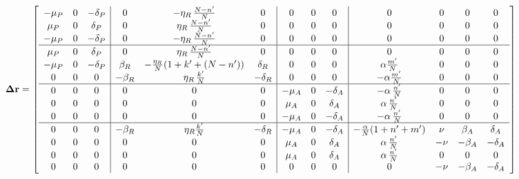 \begin{center}
\begin{sideways}
\begin{minipage}{\textheight}
\begin{equation}
{\bf \Delta r} = 
\left[ \begin{array}{ccc|ccc|ccc|cccc}
-\mu_P & 0 & -\delta_P   & 0 & -\eta_R\,\frac{N-n'}{N} & 0  & 0 & 0 & 0  & 0 & 0 & 0 & 0 \\
 \mu_P & 0 &  \delta_P   & 0 &  \eta_R\,\frac{N-n'}{N} & 0  & 0 & 0 & 0  & 0 & 0 & 0 & 0 \\
-\mu_P & 0 & -\delta_P   & 0 & -\eta_R\,\frac{N-n'}{N} & 0  & 0 & 0 & 0  & 0 & 0 & 0 & 0 \\
\hline
 \mu_P & 0  &  \delta_P   & 0        & \eta_R\,\frac{N-n'}{N}          & 0          & 0 & 0 & 0  & 0                   & 0 & 0 & 0  \\
-\mu_P & 0  & -\delta_P   &  \beta_R & -\frac{\eta_R}{N}(1+k'+(N-n'))  &  \delta_R  & 0 & 0 & 0  & \alpha\frac{m'}{N}  & 0 & 0 & 0 \\
 0     & 0  &  0          & -\beta_R & \eta_R\,\frac{k'}{N}            & -\delta_R  & 0 & 0 & 0  & -\alpha\frac{m'}{N} & 0 & 0 & 0 \\
\hline
0 & 0 & 0                 & 0 & 0 & 0                                              & -\mu_A & 0 & -\delta_A     & -\alpha\,\frac{n'}{N}       &  0   &  0       &  0 \\
0 & 0 & 0                 & 0 & 0 & 0                                              &  \mu_A & 0 &  \delta_A     &  \alpha\,\frac{n'}{N}       &  0   &  0       &  0 \\
0 & 0 & 0                 & 0 & 0 & 0                                              & -\mu_A & 0 &  -\delta_A     & -\alpha\,\frac{n'}{N}       &  0   &  0       &  0 \\
\hline
0 & 0 & 0                 & -\beta_R & \eta_R\frac{k'}{N}              & -\delta_R   & -\mu_A & 0 & -\delta_A     & -\frac{\alpha}{N}(1+n'+m') &  \nu &  \beta_A &  \delta_A  \\
0 & 0 & 0                 & 0 & 0 & 0                                              &  \mu_A & 0 &  \delta_A     & \alpha\,\frac{n'}{N}        & -\nu & -\beta_A & -\delta_A  \\
0 & 0 & 0                 & 0 & 0 & 0                                              &  \mu_A & 0 &  \delta_A     & \alpha\,\frac{n'}{N}        &  0   &  0       &  0         \\
0 & 0 & 0                 & 0 & 0 & 0                                              & 0      & 0 &  0            & 0                          & -\nu & -\beta_A & -\delta_A  \\
\end{array}
\right]
\label{Delta_E}
\end{equation}
\end{minipage}
\end{sideways}
\end{center}

